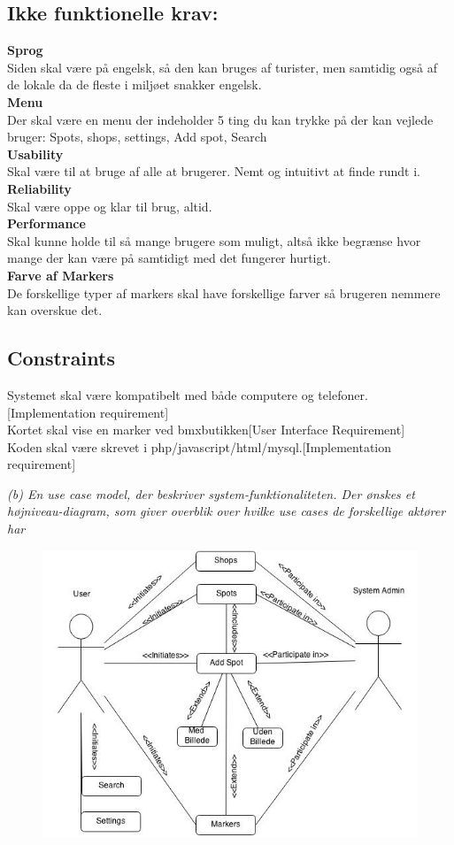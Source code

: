 \documentclass[12pt]{article}
\begin{document}
\subsection*{Ikke funktionelle krav:}
\textbf{Sprog}\\ Siden skal være på engelsk, så den kan bruges af turister, men samtidig også af de lokale da de fleste i miljøet snakker engelsk.\\
\textbf{Menu}\\ Der skal være en menu der indeholder 5 ting du kan trykke på der kan vejlede bruger: Spots, shops, settings, Add spot, Search\\
\textbf{Usability}\\ Skal være til at bruge af alle at brugerer. Nemt og intuitivt at finde rundt i.
\textbf{Reliability}\\ Skal være oppe og klar til brug, altid.\\
\textbf{Performance}\\ Skal kunne holde til så mange brugere som muligt, altså ikke begrænse hvor mange der kan være på samtidigt med det fungerer hurtigt. \\
\textbf{Farve af Markers}\\ De forskellige typer af markers skal have forskellige farver så brugeren nemmere kan overskue det.
\subsection*{Constraints}
Systemet skal være kompatibelt med både computere og telefoner.[Implementation requirement]\\
Kortet skal vise en marker ved bmxbutikken[User Interface Requirement]\\
Koden skal være skrevet i php/javascript/html/mysql.[Implementation requirement]\\

\pagebreak

\textit{(b) En use case model, der beskriver system-funktionaliteten. Der ønskes et højniveau-diagram,
som giver overblik over hvilke use cases de forskellige aktører har}\\
\begin{figure}[htb]
\includegraphics[scale = 0.8]{UM.jpg}
\end{figure}
\end{document}
